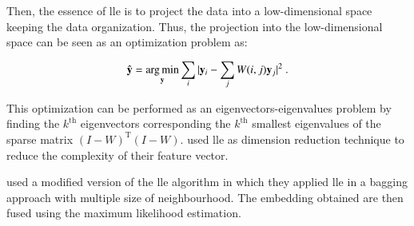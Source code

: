Then, the essence of \ac{lle} is to project the data into a low-dimensional space keeping the data organization. Thus, the projection into the low-dimensional space can be seen as an optimization problem as:

\begin{equation}
	\hat{\mathbf{y}} = \operatorname*{arg\,min}_{\mathbf{y}} \sum_i | \mathbf{y}_i - \sum_j W(i,j)\mathbf{y}_j |^{2} \ .
	\label{eq:lowprojlle}
\end{equation}

This optimization can be performed as an eigenvectors-eigenvalues problem by finding the $k^{\text{th}}$ eigenvectors corresponding the $k^{\text{th}}$ smallest eigenvalues of the sparse matrix $(I-W)^{\text{T}}(I-W)$. \cite{Tiwari2008,Tiwari2009,Viswanath2008,Viswanath2008a} used \ac{lle} as dimension reduction technique to reduce the complexity of their feature vector.

\cite{Tiwari2008} used a modified version of the \ac{lle} algorithm in which they applied \ac{lle} in a bagging approach with multiple size of neighbourhood. The embedding obtained are then fused using the maximum likelihood estimation.